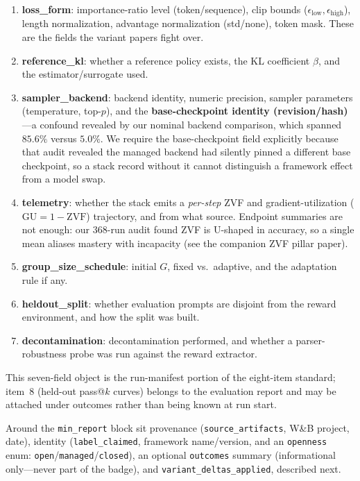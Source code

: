 \documentclass{article}
\providecommand{\eps}{\ensuremath{\epsilon}}
\begin{document}
\begin{enumerate}[leftmargin=1.8em, itemsep=0.1em]
  \item \textbf{loss_form}: importance-ratio level (token/sequence), clip
        bounds ($\eps_{\text{low}}, \eps_{\text{high}}$), length
        normalization, advantage normalization (std/none), token mask. These
        are the fields the variant papers fight over.
  \item \textbf{reference_kl}: whether a reference policy exists, the KL
        coefficient $\beta$, and the estimator/surrogate used.
  \item \textbf{sampler_backend}: backend identity, numeric precision, sampler
        parameters (temperature, top-$p$), and the \textbf{base-checkpoint
        identity (revision/hash)}---a confound revealed by our nominal
        backend comparison, which spanned $85.6\%$ versus $5.0\%$. We require the base-checkpoint
        field explicitly because that audit revealed the managed backend had
        silently pinned a different base checkpoint, so a stack record without it
        cannot distinguish a framework effect from a model swap.
  \item \textbf{telemetry}: whether the stack emits a \emph{per-step} ZVF and
        gradient-utilization ($\mathrm{GU}=1-\mathrm{ZVF}$) trajectory, and
        from what source. Endpoint summaries are not enough: our 368-run audit
        found ZVF is U-shaped in accuracy, so a single mean aliases mastery
        with incapacity (see the companion ZVF pillar paper).
  \item \textbf{group_size_schedule}: initial $G$, fixed vs.\ adaptive, and
        the adaptation rule if any.
  \item \textbf{heldout_split}: whether evaluation prompts are disjoint from
        the reward environment, and how the split was built.
  \item \textbf{decontamination}: decontamination performed, and whether a
        parser-robustness probe was run against the reward extractor.
\end{enumerate}

This seven-field object is the run-manifest portion of the eight-item standard;
item~8 (held-out pass@$k$ curves) belongs to the evaluation report and may be
attached under outcomes rather than being known at run start.

Around the \texttt{min_report} block sit provenance
(\texttt{source_artifacts}, W\&B project, date), identity
(\texttt{label_claimed}, framework name/version, and an
\texttt{openness} enum: \texttt{open}/\texttt{managed}/\texttt{closed}), an
optional \texttt{outcomes} summary (informational only---never part of the
badge), and \texttt{variant_deltas_applied}, described next.
\end{document}
